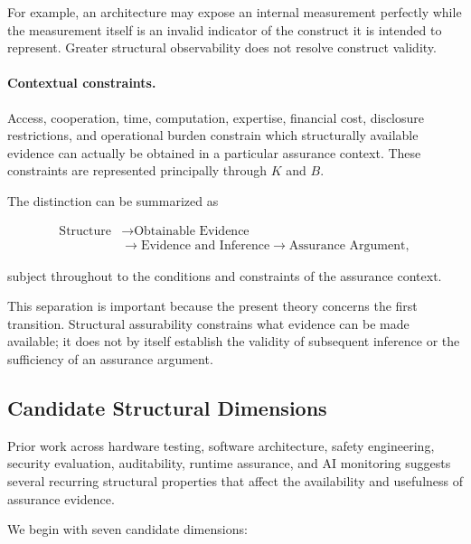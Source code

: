 For example, an architecture may expose an internal measurement perfectly
while the measurement itself is an invalid indicator of the construct
it is intended to represent.
Greater structural observability does not resolve construct validity.

\paragraph{Contextual constraints.}
Access, cooperation, time, computation, expertise, financial cost,
disclosure restrictions, and operational burden constrain which
structurally available evidence can actually be obtained in a
particular assurance context.
These constraints are represented principally through \(K\) and \(B\).

The distinction can be summarized as

\begin{equation}
  \boxed{
    \begin{aligned}
      \text{Structure}
       & \longrightarrow
      \text{Obtainable Evidence} \\
       & \longrightarrow
      \text{Evidence and Inference}
      \longrightarrow
      \text{Assurance Argument},
    \end{aligned}
  }
  \label{eq:three-layer-chain}
\end{equation}

subject throughout to the conditions and constraints of the assurance context.

This separation is important because the present theory concerns
the first transition.
Structural assurability constrains what evidence can be made available;
it does not by itself establish the validity of subsequent inference
or the sufficiency of an assurance argument.

\subsection{Candidate Structural Dimensions}
\label{aa.subsec.candidate-dimensions}

Prior work across hardware testing, software architecture, safety
engineering, security evaluation, auditability, runtime assurance,
and AI monitoring suggests several recurring structural properties
that affect the availability and usefulness of assurance evidence.

We begin with seven candidate dimensions:


